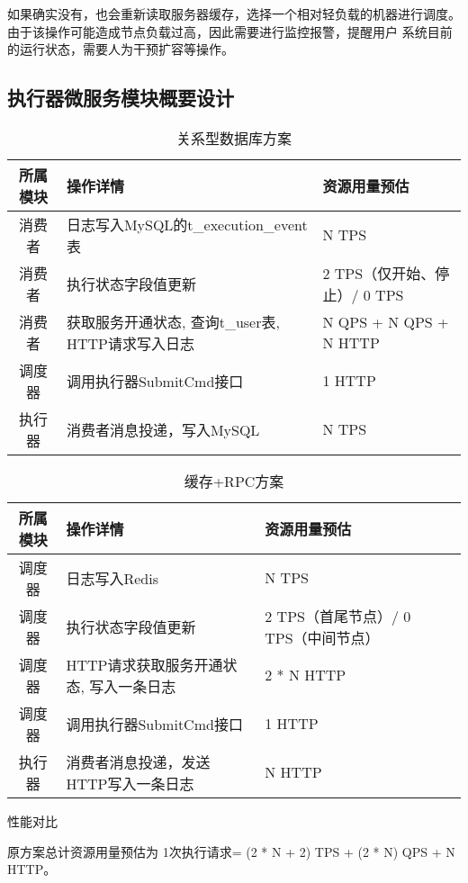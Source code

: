 如果确实没有，也会重新读取服务器缓存，选择一个相对轻负载的机器进行调度。由于该操作可能造成节点负载过高，因此需要进行监控报警，提醒用户
系统目前的运行状态，需要人为干预扩容等操作。


\subsection{执行器微服务模块概要设计}

\begin{table}[H]
    \centering
    \caption{关系型数据库方案}
    \label{tab:old_design}
    \begin{tabular}{cll}
        \toprule
        所属模块    &操作详情   &资源用量预估 \\
        \midrule
        消费者 & 日志写入MySQL的t\_execution\_event表 & N TPS \\
        消费者 & 执行状态字段值更新 & 2 TPS（仅开始、停止）/ 0 TPS \\
        消费者 & 获取服务开通状态, 查询t\_user表, HTTP请求写入日志 & N QPS + N QPS + N HTTP \\
        调度器 & 调用执行器SubmitCmd接口 & 1 HTTP \\
        执行器 & 消费者消息投递，写入MySQL & N TPS \\
        \bottomrule
    \end{tabular}
\end{table}



\begin{table}[H]
    \centering
    \caption{缓存+RPC方案}
    \label{tab:new_design}
    \begin{tabular}{cllll}
        \toprule
        所属模块	&操作详情	&资源用量预估 \\
        \midrule
        调度器 & 日志写入Redis & N TPS \\
        调度器 & 执行状态字段值更新 & 2 TPS（首尾节点）/ 0 TPS（中间节点） \\
        调度器 & HTTP请求获取服务开通状态, 写入一条日志 & 2 * N HTTP \\
        调度器 & 调用执行器SubmitCmd接口 & 1 HTTP \\
        执行器 & 消费者消息投递，发送HTTP写入一条日志 & N HTTP \\
        \bottomrule
    \end{tabular}
\end{table}

性能对比

原方案总计资源用量预估为 1次执行请求= (2 * N + 2) TPS + (2 * N) QPS + N HTTP。

